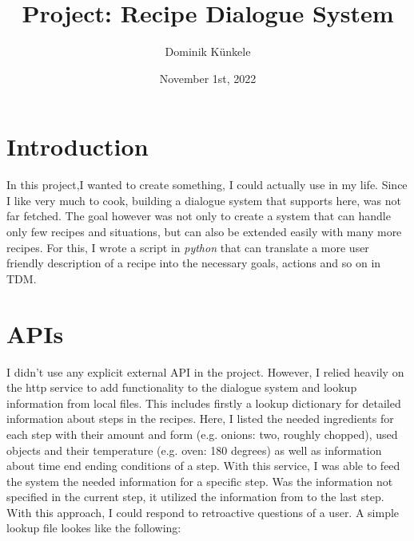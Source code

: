 \documentclass[
	11pt, %
]{fphw}
\title{Project: Recipe Dialogue System} %
\date{November 1st, 2022} %
\author{Dominik Künkele}
\institute{University of Gothenburg} %
\begin{document}
\maketitle %

\listoftodos

\section*{Introduction}
In this project,I wanted to create something, I could actually use in my life. Since I like very much to cook, building a dialogue system that supports here, was not far fetched. The goal however was not only to create a system that can handle only few recipes and situations, but can also be extended easily with many more recipes. For this, I wrote a script in \emph{python} that can translate a more user friendly description of a recipe into the necessary goals, actions and so on in TDM.

\section*{APIs}
I didn't use any explicit external API in the project. However, I relied heavily on the http service to add functionality to the dialogue system and lookup information from local files. This includes firstly a lookup dictionary for detailed information about steps in the recipes. Here, I listed the needed ingredients for each step with their amount and form (e.g. onions: two, roughly chopped), used objects and their temperature (e.g. oven: 180 degrees) as well as information about time end ending conditions of a step. With this service, I was able to feed the system the needed information for a specific step. Was the information not specified in the current step, it utilized the information from to the last step. With this approach, I could respond to retroactive questions of a user. A simple lookup file lookes like the following:
\end{document}
